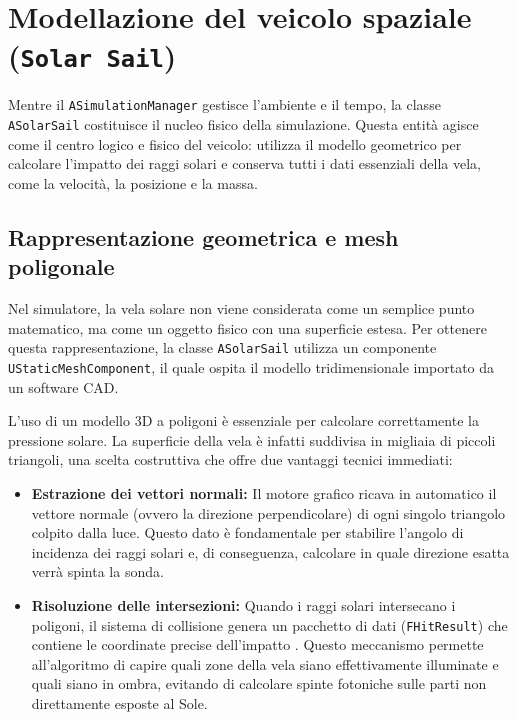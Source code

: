 \section{Modellazione del veicolo spaziale (\texttt{Solar Sail})}

Mentre il \lstinline|ASimulationManager| gestisce l'ambiente e il tempo, la classe \lstinline|ASolarSail| costituisce il nucleo fisico della simulazione. Questa entità agisce come il centro logico e fisico del veicolo: utilizza il modello geometrico per calcolare l'impatto dei raggi solari e conserva tutti i dati essenziali della vela, come la velocità, la posizione e la massa.


\subsection{Rappresentazione geometrica e mesh poligonale}

Nel simulatore, la vela solare non viene considerata come un semplice punto matematico, ma come un oggetto fisico con una superficie estesa. Per ottenere questa rappresentazione, la classe \lstinline|ASolarSail| utilizza un componente \lstinline|UStaticMeshComponent|, il quale ospita il modello tridimensionale importato da un software CAD.

L'uso di un modello 3D a poligoni è essenziale per calcolare correttamente la pressione solare. La superficie della vela è infatti suddivisa in migliaia di piccoli triangoli, una scelta costruttiva che offre due vantaggi tecnici immediati:

\begin{itemize}
    \item \textbf{Estrazione dei vettori normali:} Il motore grafico ricava in automatico il vettore normale (ovvero la direzione perpendicolare) di ogni singolo triangolo colpito dalla luce. Questo dato è fondamentale per stabilire l'angolo di incidenza dei raggi solari e, di conseguenza, calcolare in quale direzione esatta verrà spinta la sonda.
    \item \textbf{Risoluzione delle intersezioni:} Quando i raggi solari intersecano i poligoni, il sistema di collisione genera un pacchetto di dati (\lstinline|FHitResult|) che contiene le coordinate precise dell'impatto \cite{epicgames_unrealengine, ericson2004real}. Questo meccanismo permette all'algoritmo di capire quali zone della vela siano effettivamente illuminate e quali siano in ombra, evitando di calcolare spinte fotoniche sulle parti non direttamente esposte al Sole.
\end{itemize}

